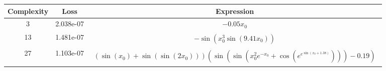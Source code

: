 \begin{center}
        \begin{tabular}{|c|c|c|}
        \hline
        Complexity & Loss & Expression \\
        \hline
        3 & 2.038e-07 & $\begin{aligned}- 0.05 x_{0}\end{aligned}$\\ \hline13 & 1.481e-07 & $\begin{aligned}- \sin{\left(x_{0}^{3} \sin{\left(9.41 x_{0} \right)} \right)}\end{aligned}$\\ \hline27 & 1.103e-07 & $\begin{aligned}\left(\sin{\left(x_{0} \right)} + \sin{\left(\sin{\left(2 x_{0} \right)} \right)}\right) \left(\sin{\left(\sin{\left(x_{0}^{2} e^{- x_{0}} + \cos{\left(e^{e^{\sin{\left(x_{0} + 1.38 \right)}}} \right)} \right)} \right)} - 0.19\right)\end{aligned}$\\ \hline\end{tabular}
        \end{center}
        